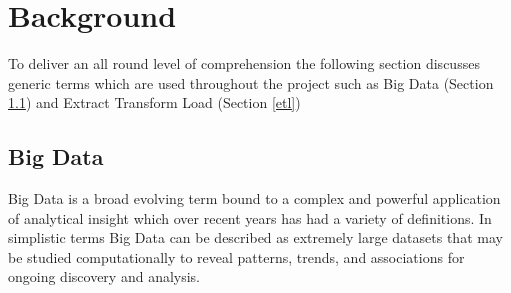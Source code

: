 \chapter{Background}
To deliver an all round level of comprehension the following section discusses generic terms which are used throughout the project such as Big Data (Section \ref{bigdata}) and Extract Transform Load (Section \ref{etl})

\section{Big Data}\label{bigdata}
Big Data is a broad evolving term bound to a complex and powerful application of analytical insight which over recent years has had a variety of definitions. In simplistic terms Big Data can be described as extremely large datasets that may be studied computationally to reveal patterns, trends, and associations for ongoing discovery and analysis.

